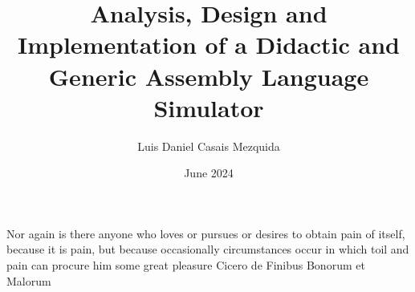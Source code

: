 \documentclass[en]{uc3mthesisIEEE}
\title{Analysis, Design and Implementation of a Didactic and Generic Assembly Language Simulator}
\author{Luis Daniel Casais Mezquida}
\date{June 2024}
\begin{document}
  \makecover

  \makeepigraph
    {Nor again is there anyone who loves or pursues or desires to obtain pain of itself, because it is pain, but because occasionally circumstances occur in which toil and pain can procure him some great pleasure}  %
    {Cicero}  %
    {de Finibus Bonorum et Malorum}  %


  \begin{abstract}
    \lipsum[1-3]
  \end{abstract}


  \begin{acknowledgements}
  \end{acknowledgements}


  \tableofcontents
  \listoffigures
  \listoftables


  \begin{thesis}
  \end{thesis}

  \cleardoublepage
  \label{bibliography}
  \printbibliography[heading=bibintoc,title={References}]

  \cleardoublepage
  \label{glossary}
	\printglossaries


  \begin{appendices}
  \end{appendices}
\end{document}
